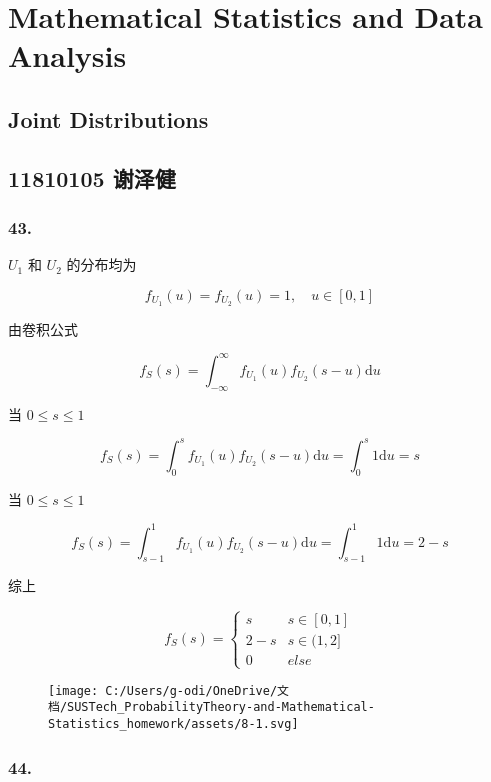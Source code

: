 \documentclass[]{article}
\date{}
\begin{document}
\section{Mathematical Statistics and Data Analysis}\label{header-n0}

\subsection{Joint Distributions}\label{header-n2}

\subsection{11810105 谢泽健}\label{header-n3}

\subsubsection{43.}\label{header-n4}

\(U_1\) 和 \(U_2\) 的分布均为

\[f_{U_{1}}(u)=f_{U_{2}}(u)=1, \quad u \in[0,1]\]

由卷积公式

\[f_{S}(s)=\int_{-\infty}^{\infty} f_{U_1}(u) f_{U_2}(s-u) \mathrm{d} u\]

当 \(0\le s\le1\)

\[f_{S}(s)=\int_{0}^{s} f_{U_1}(u) f_{U_2}(s-u) \mathrm{d} u=\int_{0}^{s} 1 \mathrm{d} u=s\]

当 \(0\le s\le1\)

\[f_{S}(s)=\int_{s-1}^{1} f_{U_1}(u) f_{U_2}(s-u) \mathrm{d} u=\int_{s-1}^{1} 1 \mathrm{d} u=2-s\]

综上

\[f_{S}(s)=\left\{\begin{array}{ll}{s} & {s \in[0,1]} \\ 
{2-s} & {s \in(1,2]}
\\ 0 & else
\end{array}\right.\]

\begin{figure}
\centering
\texttt{[image: C:/Users/g-odi/OneDrive/文档/SUSTech\_ProbabilityTheory-and-Mathematical-Statistics\_homework/assets/8-1.svg]}
\caption{}
\end{figure}

\subsubsection{44.}\label{header-n16}
\end{document}
